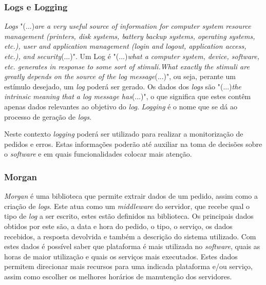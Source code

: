 \subsubsection{Logs e Logging}
\textit{Logs} "(...)\emph{are a very useful source of information for computer system resource management (printers, disk systems, battery backup systems, operating systems, etc.), user and application management (login and logout, application access, etc.), and security}(...)"\citep{Logging}. Um Log é "(...)\emph{what a computer system, device, software, etc. generates in response to some sort of stimuli.What exactly the stimuli are greatly depends on the source of the log message}(...)"\citep{Logging}, ou seja, perante um estímulo desejado, um \textit{log} poderá ser gerado. Os dados dos \textit{logs} são "(...)\emph{the intrinsic meaning that a log message has}(...)"\citep{Logging}, o que significa que estes contêm apenas dados relevantes ao objetivo do \textit{log}. \textit{Logging} é o nome que se dá ao processo de geração de \textit{logs}.

Neste contexto \textit{logging} poderá ser utilizado para realizar a monitorização de pedidos e erros. Estas informações poderão até auxiliar na toma de decisões sobre o \textit{software} e em quais funcionalidades colocar mais atenção.

\subsubsection{Morgan}

\textit{Morgan} é uma biblioteca que permite extrair dados de um pedido, assim como a criação de \textit{logs}. Este atua como um \textit{middleware} do servidor, que recebe qual o tipo de \textit{log} a ser escrito, estes estão definidos na biblioteca. Os principais dados obtidos por este são, a data e hora do pedido, o tipo, o serviço, os dados recebidos, a resposta devolvida e também a descrição do sistema utilizado. Com estes dados é possível saber que plataforma é mais utilizada no \textit{software}, quais as horas de maior utilização e quais os serviços mais executados. Estes dados permitem direcionar mais recursos para uma indicada plataforma e/ou serviço, assim como escolher os melhores horários de manutenção dos servidores.